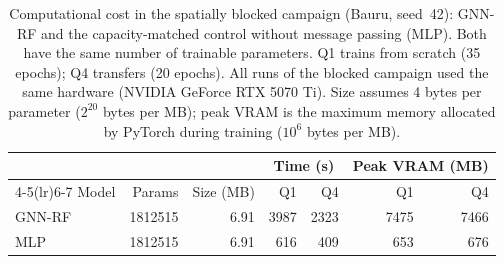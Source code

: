 \begin{table}[!t]
\centering
\caption{Computational cost in the spatially blocked campaign (Bauru, seed~42): GNN-RF and the capacity-matched control without message passing (MLP). Both have the same number of trainable parameters. Q1 trains from scratch (35 epochs); Q4 transfers (20 epochs). All runs of the blocked campaign used the same hardware (NVIDIA GeForce RTX 5070 Ti). Size assumes 4 bytes per parameter ($2^{20}$ bytes per MB); peak VRAM is the maximum memory allocated by PyTorch during training ($10^{6}$ bytes per MB).}
\label{tab:cost}
\setlength{\tabcolsep}{4pt}
\begin{tabular}{lrrrrrr}
\toprule
 & & & \multicolumn{2}{c}{Time (s)} & \multicolumn{2}{c}{Peak VRAM (MB)} \\
\cmidrule(lr){4-5}\cmidrule(lr){6-7}
Model & Params & Size (MB) & Q1 & Q4 & Q1 & Q4 \\
\midrule
GNN-RF & \num{1812515} & 6.91 & 3987 & 2323 & 7475 & 7466 \\
MLP & \num{1812515} & 6.91 & 616 & 409 & 653 & 676 \\
\bottomrule
\end{tabular}
\end{table}
